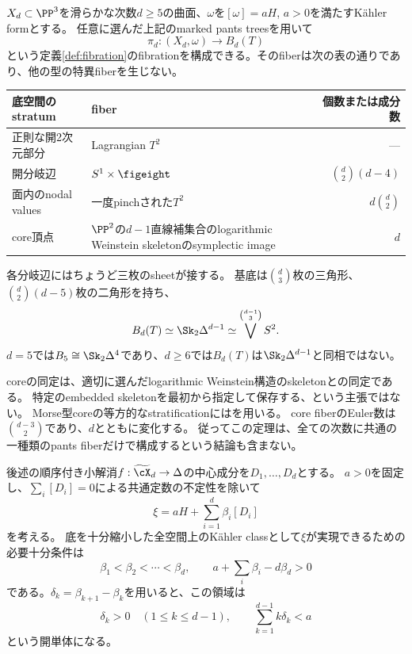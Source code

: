 \begin{theorem}[境界のない分岐底空間への構成]\label{main:global}
$X_d\subset\PP^3$を滑らかな次数$d\ge5$の曲面、$\omega$を$[\omega]=aH$, $a>0$を満たすKähler formとする。
任意に選んだ上記のmarked pants treesを用いて
\[
\pi_d:(X_d,\omega)\longrightarrow B_d(T)
\]
という定義\ref{def:fibration}のfibrationを構成できる。そのfiberは次の表の通りであり、他の型の特異fiberを生じない。
\begin{center}
\begin{tabularx}{\linewidth}{@{}lXr@{}}
\toprule
底空間のstratum & fiber & 個数または成分数\\
\midrule
正則な開2次元部分 & Lagrangian $T^2$ & ---\\
開分岐辺 & $S^1\times\figeight$ & $\binom d2(d-4)$\\
面内のnodal values & 一度pinchされた$T^2$ & $d\binom d2$\\
core頂点 & $\PP^2$の$d-1$直線補集合のlogarithmic Weinstein skeletonのsymplectic image & $d$\\
\bottomrule
\end{tabularx}
\end{center}
各分岐辺にはちょうど三枚のsheetが接する。
基底は$\binom d3$枚の三角形、$\binom d2(d-5)$枚の二角形を持ち、
\[
B_d(T)\simeq\Sk_2\Delta^{d-1}\simeq\bigvee^{\binom{d-1}{3}}S^2.
\]
$d=5$では$B_5\cong\Sk_2\Delta^4$であり、$d\ge6$では$B_d(T)$は$\Sk_2\Delta^{d-1}$と同相ではない。
\end{theorem}

coreの同定は、適切に選んだlogarithmic Weinstein構造のskeletonとの同定である。
特定のembedded skeletonを最初から指定して保存する、という主張ではない。
Morse型coreの等方的なstratificationには\cite[\S2.3]{EM}を用いる。
core fiberのEuler数は$\binom{d-3}{2}$であり、$d$とともに変化する。
従ってこの定理は、全ての次数に共通の一種類のpants fiberだけで構成するという結論も含まない。

\begin{theorem}\label{main:cone}
後述の順序付き小解消$f:\widetilde{\cX}_d\to\Delta$の中心成分を$D_1,\ldots,D_d$とする。
$a>0$を固定し、$\sum_i[D_i]=0$による共通定数の不定性を除いて
\[
\xi=aH+\sum_{i=1}^d\beta_i[D_i]
\]
を考える。
底を十分縮小した全空間上のKähler classとして$\xi$が実現できるための必要十分条件は
\[
\beta_1<\beta_2<\cdots<\beta_d,
\qquad a+\sum_i\beta_i-d\beta_d>0
\]
である。$\delta_k=\beta_{k+1}-\beta_k$を用いると、この領域は
\[
\delta_k>0\quad(1\le k\le d-1),\qquad
\sum_{k=1}^{d-1}k\delta_k<a
\]
という開単体になる。
\end{theorem}

